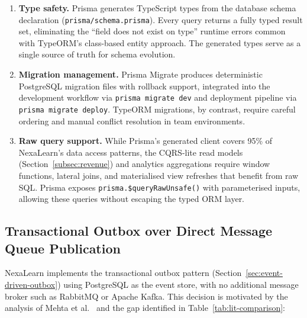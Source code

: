 \begin{enumerate}
  \item \textbf{Type safety.} Prisma generates TypeScript types from the database schema declaration (\texttt{prisma/schema.prisma}). Every query returns a fully typed result set, eliminating the ``field does not exist on type'' runtime errors common with TypeORM's class-based entity approach. The generated types serve as a single source of truth for schema evolution.
  \item \textbf{Migration management.} Prisma Migrate produces deterministic PostgreSQL migration files with rollback support, integrated into the development workflow via \texttt{prisma migrate dev} and deployment pipeline via \texttt{prisma migrate deploy}. TypeORM migrations, by contrast, require careful ordering and manual conflict resolution in team environments.
  \item \textbf{Raw query support.} While Prisma's generated client covers 95\% of NexaLearn's data access patterns, the CQRS-lite read models (Section~\ref{subsec:revenue}) and analytics aggregations require window functions, lateral joins, and materialised view refreshes that benefit from raw SQL. Prisma exposes \texttt{prisma.\$queryRawUnsafe()} with parameterised inputs, allowing these queries without escaping the typed ORM layer.
\end{enumerate}

\subsection{Transactional Outbox over Direct Message Queue Publication}

NexaLearn implements the transactional outbox pattern (Section~\ref{sec:event-driven-outbox}) using PostgreSQL as the event store, with no additional message broker such as RabbitMQ or Apache Kafka. This decision is motivated by the analysis of Mehta et al.~\cite{mehta2023eda} and the gap identified in Table~\ref{tab:lit-comparison}:

